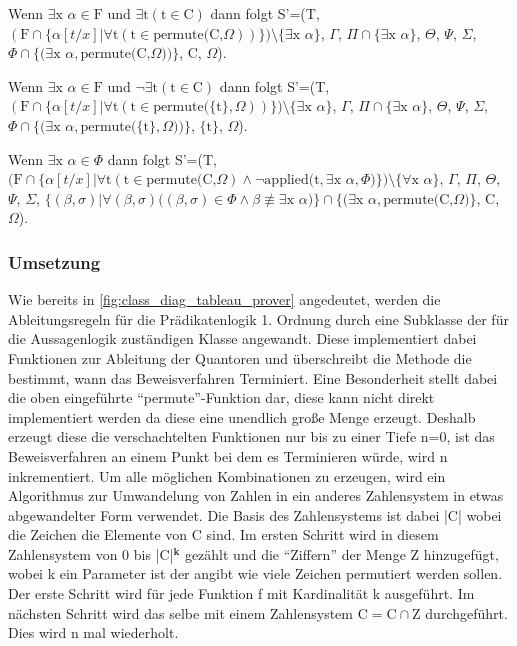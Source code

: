 Wenn $\exists\textrm{x}$ $\alpha\in\textrm{F}$ und $\exists\textrm{t}(\textrm{t}\in\textrm{C})$ dann folgt S'=(T, $(\textrm{F}\cap\lbrace\alpha[t/x]|\forall\textrm{t}(\textrm{t}\in\textrm{permute(C,}\Omega))\rbrace)\setminus\lbrace\exists\textrm{x}$ $\alpha\rbrace$, $\Gamma$, $\Pi\cap\lbrace\exists\textrm{x}$ $\alpha\rbrace$, $\Theta$, $\Psi$, $\Sigma$, $\Phi\cap\lbrace(\exists\textrm{x}$ $\alpha,\textrm{permute(C,}\Omega))\rbrace$, C, $\Omega$).

Wenn $\exists\textrm{x}$ $\alpha\in\textrm{F}$ und $\neg\exists\textrm{t}(\textrm{t}\in\textrm{C})$ dann folgt S'=(T, $(\textrm{F}\cap\lbrace\alpha[t/x]|\forall\textrm{t}(\textrm{t}\in\textrm{permute(}\lbrace\textrm{t}\rbrace,\Omega))\rbrace)\setminus\lbrace\exists\textrm{x}$ $\alpha\rbrace$, $\Gamma$, $\Pi\cap\lbrace\exists\textrm{x}$ $\alpha\rbrace$, $\Theta$, $\Psi$, $\Sigma$, $\Phi\cap\lbrace(\exists\textrm{x}$ $\alpha,\textrm{permute(}\lbrace\textrm{t}\rbrace,\Omega))\rbrace$, $\lbrace\textrm{t}\rbrace$, $\Omega$).

Wenn $\exists\textrm{x}$ $\alpha\in\Phi$ dann folgt S'=(T, $(\textrm{F}\cap\lbrace\alpha[t/x]|\forall\textrm{t}(\textrm{t}\in\textrm{permute(C,}\Omega)\wedge\neg\textrm{applied(t},\exists\textrm{x}$ $\alpha, \Phi)\rbrace)\setminus\lbrace\forall\textrm{x}$ $\alpha\rbrace$, $\Gamma$, $\Pi$, $\Theta$, $\Psi$, $\Sigma$, $\lbrace(\beta,\sigma)|\forall(\beta,\sigma)((\beta,\sigma)\in\Phi\wedge\beta \not\equiv \exists\textrm{x}$ $\alpha)\rbrace\cap\lbrace(\exists\textrm{x}$ $\alpha,\textrm{permute(C,}\Omega)\rbrace$, C, $\Omega$).

\subsubsection{Umsetzung}
Wie bereits in \autoref{fig:class_diag_tableau_prover} angedeutet, werden die Ableitungsregeln für die Prädikatenlogik 1. Ordnung durch eine Subklasse der für die Aussagenlogik zuständigen Klasse angewandt. Diese implementiert dabei Funktionen zur Ableitung der Quantoren und überschreibt die Methode die bestimmt, wann das Beweisverfahren Terminiert. Eine Besonderheit stellt dabei die oben eingeführte ``permute''-Funktion dar, diese kann nicht direkt implementiert werden da diese eine unendlich große Menge erzeugt. Deshalb erzeugt diese die verschachtelten Funktionen nur bis zu einer Tiefe n=0, ist das Beweisverfahren an einem Punkt bei dem es Terminieren würde, wird n inkrementiert. Um alle möglichen Kombinationen zu erzeugen, wird ein Algorithmus zur Umwandelung von Zahlen in ein anderes Zahlensystem in etwas abgewandelter Form verwendet. Die Basis des Zahlensystems ist dabei |C| wobei die Zeichen die Elemente von C sind. Im ersten Schritt wird in diesem Zahlensystem von 0 bis |C|$^{\textbf{k}}$ gezählt und die ``Ziffern'' der Menge Z hinzugefügt, wobei k ein Parameter ist der angibt wie viele Zeichen permutiert werden sollen. Der erste Schritt wird für jede Funktion f mit Kardinalität k ausgeführt. Im nächsten Schritt wird das selbe mit einem Zahlensystem $\textrm{C}=\textrm{C}\cap\textrm{Z}$ durchgeführt. Dies wird n mal wiederholt.

